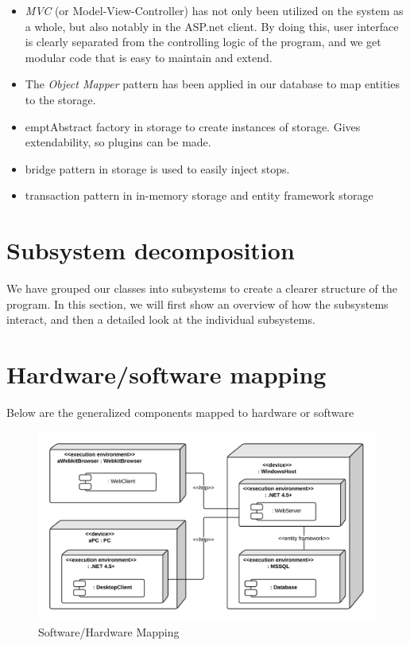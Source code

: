 \begin{itemize}
	\item \emph{MVC} (or Model-View-Controller) has not only been utilized on the system as a whole, but also notably in the ASP.net client. By doing this, user interface is clearly separated from the controlling logic of the program, and we get modular code that is easy to maintain and extend.
	\item The \emph{Object Mapper} pattern has been applied in our database to map entities to the storage.
	\item empt{Abstract factory} in storage to create instances of storage. Gives extendability, so plugins can be made.
	\item bridge pattern in storage is used to easily inject stops.
	\item transaction pattern in in-memory storage and entity framework storage
\end{itemize}

\section{Subsystem decomposition}
We have grouped our classes into subsystems to create a clearer structure of the program. In this section, we will first show an overview of how the subsystems interact, and then a detailed look at the individual subsystems.



\section{Hardware/software mapping}
\label{sec:Hardware/software mapping}
Below are the generalized components mapped to hardware or software
\begin{figure}[H]
\includegraphics[scale=0.2]{img/SoftwareHardwareMapping.png}
\caption{Software/Hardware Mapping}
\label{fig:SoftwareHardwareMapping}
\end{figure}

